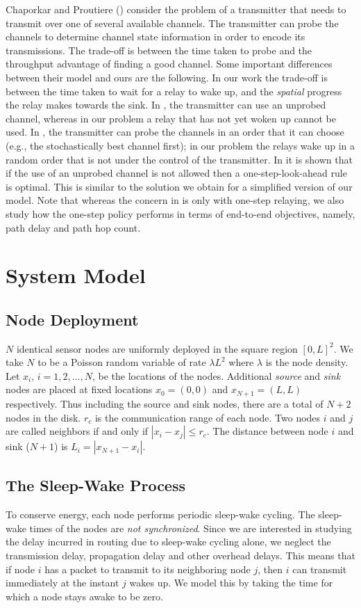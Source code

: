 \documentclass[onecolumn]{IEEEtran}
\begin{document}
Chaporkar and Proutiere (\cite{chaporkar-proutiere08joint-probing})
consider the problem of a transmitter that needs to transmit over one
of several available channels. The transmitter can probe the channels
to determine channel state information in order to encode its
transmissions. The trade-off is between the time taken to probe and
the throughput advantage of finding a good channel. Some important
differences between their model and ours are the following.  In our
work the trade-off is between the time taken to wait for a relay to
wake up, and the \emph{spatial} progress the relay makes towards the
sink. In \cite{chaporkar-proutiere08joint-probing}, the transmitter
can use an unprobed channel, whereas in our problem a relay that has
not yet woken up cannot be used. In
\cite{chaporkar-proutiere08joint-probing}, the transmitter can probe
the channels in an order that it can choose (e.g., the stochastically
best channel first); in our problem the relays wake up in a random
order that is not under the control of the transmitter. In
\cite{chaporkar-proutiere08joint-probing} it is shown that if the use
of an unprobed channel is not allowed then a one-step-look-ahead rule
is optimal. This is similar to the solution we obtain for a simplified
version of our model. Note that whereas the concern in
\cite{chaporkar-proutiere08joint-probing} is only with one-step
relaying, we also study how the one-step policy performs in terms of
end-to-end objectives, namely, path delay and path hop count.

\section{System Model}
\label{system_model}
\subsection{Node Deployment}
$N$ identical sensor nodes are uniformly deployed in the square region
$[0,L]^2$. We take $N$ to be a Poisson random variable of rate
$\lambda L^2$ where $\lambda$ is the node density. Let $x_i$,
$i=1,2,...,N$, be the locations of the nodes. Additional \emph{source} and
\emph{sink} nodes are placed at fixed locations $x_0=(0,0)$ and
$x_{N+1}=(L,L)$ respectively. Thus including the source and sink
nodes, there are a total of $N+2$ nodes in the disk. $r_c$ is the
communication range of each node. Two nodes $i$ and $j$ are called
neighbors if and only if $|x_i-x_j|\le r_c$. The distance between
node $i$ and sink ($N+1$) is $L_i=|x_{N+1}-x_i|$.
\subsection{The Sleep-Wake Process}
To conserve energy, each node performs periodic sleep-wake cycling.
The sleep-wake times of the nodes are \emph{not synchronized}. Since
we are interested in studying the delay incurred in routing due to
sleep-wake cycling alone, we neglect the transmission delay,
propagation delay and other overhead delays. This means that if node
$i$ has a packet to transmit to its neighboring node $j$, then $i$
can transmit immediately at the instant $j$ wakes up.  We model this
by taking the time for which a node stays awake to be zero.
\end{document}

